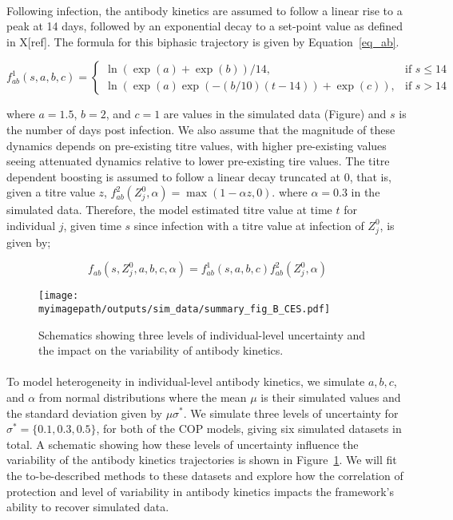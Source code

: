 \documentclass{article}
\newcommand{\myimagepath}{/Users/davidhodgson/Dropbox/Mac (3)/Documents/research/Rpackages/rjmc/}
\begin{document}
\paragraph{}Following infection, the antibody kinetics are assumed to follow a linear rise to a peak at 14 days, followed by an exponential decay to a set-point value as defined in X[ref]. The formula for this biphasic trajectory is given by Equation~\ref{eq_ab}.

\begin{equation}
\label{eq_ab}
f^1_{ab}(s, a, b, c) =
\begin{cases}
  \ln(\exp(a) + \exp(b)) / 14, & \text{if }s \leq 14 \\
  \ln(\exp(a) \exp(-(b/10)(t - 14)) + \exp(c)), &\text{if } s > 14
\end{cases}
\end{equation}

where $a = 1.5$, $b = 2$, and $c = 1$ are values in the simulated data (Figure) and $s$ is the number of days post infection. We also assume that the magnitude of these dynamics depends on pre-existing titre values, with higher pre-existing values seeing attenuated dynamics relative to lower pre-existing tire values. The titre dependent boosting is assumed to follow a linear decay truncated at 0, that is, given a titre value $z$, $f^2_{ab}(Z_j^0, \alpha) = \max(1 - \alpha z, 0)$. where $\alpha = 0.3$ in the simulated data. Therefore, the model estimated titre value at time $t$ for individual $j$, given time $s$ since infection with a titre value at infection of $Z_{j}^0$, is given by;  

\begin{equation}
\label{eq_ab2}
f_{ab}(s, Z^0_{j}, a, b, c, \alpha) = f^1_{ab}(s, a, b, c)f^2_{ab}(Z^0_{j}, \alpha) 
\end{equation}


\begin{figure}[h]
    \centering
    \texttt{[image: \\myimagepath/outputs/sim\_data/summary\_fig\_B\_CES.pdf]}     \caption{Schematics showing three levels of individual-level uncertainty and the impact on the variability of antibody kinetics.   }
    \label{fig:sim_B}
\end{figure}



\paragraph{}To model heterogeneity in individual-level antibody kinetics, we simulate $a, b, c$, and $\alpha$ from normal distributions where the mean $\mu$ is their simulated values and the standard deviation given by $\mu\sigma^*$. We simulate three levels of uncertainty for $\sigma^* = \{0.1, 0.3, 0.5\}$, for both of the COP models, giving six simulated datasets in total. A schematic showing how these levels of uncertainty influence the variability of the antibody kinetics trajectories is shown in Figure~\ref{fig:sim_B}. We will fit the to-be-described methods to these datasets and explore how the correlation of protection and level of variability in antibody kinetics impacts the framework's ability to recover simulated data. 
\end{document}
